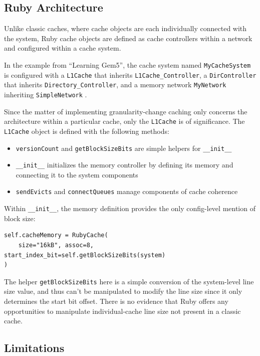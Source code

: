\documentclass[12pt,twoside]{reedthesis}
\begin{document}
	\subsection*{Ruby Architecture}

	Unlike classic caches, where cache objects are each individually connected with the system, Ruby cache objects are defined as cache controllers within a network and configured within a cache system.
	
	In the example from ``Learning Gem5'', the cache system named \verb`MyCacheSystem` is configured with a \verb`L1Cache` that inherits \verb`L1Cache_Controller`, a \verb`DirController` that inherits \verb`Directory_Controller`, and a memory network \verb`MyNetwork` inheriting \verb`SimpleNetwork` \cite{gem5-tutorial}.

	Since the matter of implementing granularity-change caching only concerns the architecture within a particular cache, only the \verb`L1Cache` is of significance. The \verb`L1Cache` object is defined with the following methods: \begin{itemize}
		\item \verb`versionCount` and \verb`getBlockSizeBits` are simple helpers for \verb`__init__`
		\item \verb`__init__` initializes the memory controller by defining its memory and connecting it to the system components
		\item \verb`sendEvicts` and \verb`connectQueues` manage components of cache coherence
	\end{itemize}

	Within \verb`__init__`, the memory definition provides the only config-level mention of block size: \begin{verbatim}
self.cacheMemory = RubyCache(
    size="16kB", assoc=8, start_index_bit=self.getBlockSizeBits(system)
)\end{verbatim}

	The helper \verb`getBlockSizeBits` here is a simple conversion of the system-level line size value, and thus can't be manipulated to modify the line size since it only determines the start bit offset. There is no evidence that Ruby offers any opportunities to manipulate individual-cache line size not present in a classic cache.

	\subsection*{Limitations}
\end{document}
